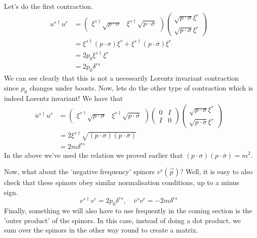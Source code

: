 Let's do the first contraction. 
\begin{align*}
	u^{ s \dagger } u ^ r &=  \begin{pmatrix}  \xi^{ s \dagger } \sqrt{ p \cdot  \sigma } & \xi ^{ s \dagger } \sqrt{ p \cdot  \overline{ \sigma } }   \end{pmatrix} 
	\begin{pmatrix}   \sqrt{ p \cdot  \sigma }  \xi ^{ r  } \\
	\sqrt{ p \cdot  \overline{ \sigma } }  \xi ^{ r } \end{pmatrix} \\
	&=  \xi ^{ s \dagger } ( p \cdot  \sigma ) \xi ^{ r } 
	+ \xi ^{ s \dagger } ( p \cdot  \overline{ \sigma } ) \xi ^{ r } \\
	&=  2p_0 \xi ^{ s \dagger } \xi ^ r  \\ 
	&=  2 p_0 \delta ^{ rs  } 
\end{align*}
We can see clearly that this is 
not a necessarily Lorentz invariant 
contraction since $ p_0 $ changes under boosts. 
Now, lets do the other type of contraction which 
is indeed Lorentz invariant! We have that 
\begin{align*}
	\overline{u }^{ s \dagger } u^ r &= \begin{pmatrix}  
		\xi ^{ s \dagger } \sqrt{ p \cdot  \sigma }  & 
\xi ^{ s \dagger } \sqrt{ p \cdot  \overline{ \sigma } }  \end{pmatrix} 
\begin{pmatrix}  0 & I \\ I & 0  \end{pmatrix}  \begin{pmatrix} 
\sqrt{ p \cdot  \sigma }  \xi ^ r \\ \sqrt{ p \cdot  \overline{ \sigma } }  \xi ^ r 
\end{pmatrix} \\
		   &=  2 \xi ^{ s \dagger }  \sqrt{ ( p \cdot  \sigma   ) 
		   ( p \cdot  \overline{ \sigma   } ) }   \\
		   &=  2m \delta ^{ r s }  
\end{align*}
In the above we've used the relation we proved 
earlier that $ ( p \cdot  \sigma ) ( p \cdot  \overline{ \sigma } )  = m ^ 2 $. 

Now, what about the 'negative frequency' spinors 
$ v ^ s ( \vec{p} ) $? 
Well, it is easy to also check that these spinors
obey similar normalisation conditions, up to 
a minus sign. 
\[
 v ^{ s \dagger} v ^ r = 2 p_0 \delta ^{ rs } , 
 \quad \overline{ v }^{ s } v ^{ r }  =  - 2m \delta ^{ rs }
\] 
Finally, something we will also have to use 
frequently in the coming section is 
the 'outer product' of the spinors. 
In this case, instead of doing a dot product, 
we sum over the spinors in the other way round 
to create a matrix.


